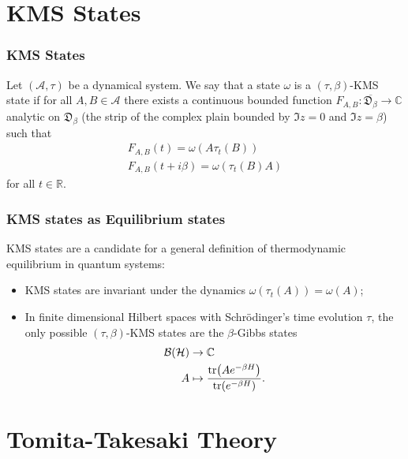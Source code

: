\documentclass{beamer}
\begin{document}
\section{KMS States}

\begin{frame}
	\frametitle{KMS States}
	\begin{definition}
		Let $(\mathcal{A},\tau)$ be a dynamical system. We say that a state $\omega$ is a $(\tau,\beta)$-KMS state if for all $A,B\in\mathcal{A}$ there exists a continuous bounded function $F_{A,B}:\overline{\mathfrak{D}_\beta}\rightarrow\mathbb{C}$ analytic on $\mathfrak{D}_\beta$ (the strip of the complex plain bounded by $\Im z = 0$ and $\Im z = \beta$) such that
		\begin{align*}
			F_{A,B}(t)=\omega(A\tau_t(B)) \\
			F_{A,B}(t+i\beta)=\omega(\tau_t(B)A)
		\end{align*}		 
		for all $t\in\mathbb{R}$.
	\end{definition}
\end{frame}

\begin{frame}
	\frametitle{KMS states as Equilibrium states}	
	KMS states are a candidate for a general definition of thermodynamic equilibrium in quantum systems\cite{Haag1992}\cite{Duvenhage1999}:
	\begin{itemize}
		\item KMS states are invariant under the dynamics $\omega(\tau_t(A))=\omega(A)$;
		\item In finite dimensional Hilbert spaces with Schrödinger's time evolution $\tau$, the only possible $(\tau,\beta)$-KMS states are the $\beta$-Gibbs states
		\begin{align*}
			\mathcal{B}(\mathcal{H})&\rightarrow\mathbb{C} \\
			A&\mapsto \frac{\tr(Ae^{-\beta H})}{\tr(e^{-\beta H})}.
		\end{align*}
	\end{itemize}
\end{frame}

\section{Tomita-Takesaki Theory}
\end{document}
